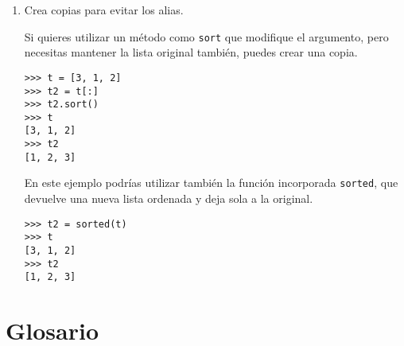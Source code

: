 \documentclass[10pt]{book}
\begin{document}
\begin{enumerate}
\item Crea copias para evitar los alias.

Si quieres utilizar un método como {\tt sort} que modifique
el argumento, pero necesitas mantener la lista original
también, puedes crear una copia.

\begin{verbatim}
>>> t = [3, 1, 2]
>>> t2 = t[:]
>>> t2.sort()
>>> t
[3, 1, 2]
>>> t2
[1, 2, 3]
\end{verbatim}

En este ejemplo podrías utilizar también la función incorporada {\tt sorted},
que devuelve una nueva lista ordenada y deja sola a la original.

\begin{verbatim}
>>> t2 = sorted(t)
>>> t
[3, 1, 2]
>>> t2
[1, 2, 3]
\end{verbatim}

\end{enumerate}



\section{Glosario}
\end{document}
